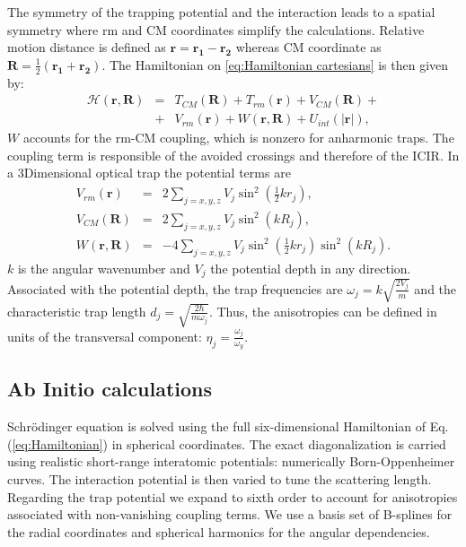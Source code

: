 \documentclass[aps,pre,twocolumn,superscriptaddress,showpacs]{revtex4-1}
\newcommand{\bfeq}[1]{{\boldsymbol{#1}}}
\begin{document}
The symmetry of the trapping potential and the interaction leads to a spatial symmetry where rm and CM coordinates simplify the calculations. Relative motion distance is defined as $\bfeq{r} = \bfeq{r_1} - \bfeq{r_2}$ whereas CM coordinate as $\bfeq{R} = \frac{1}{2}(\bfeq{r_1} + \bfeq{r_2})$. The Hamiltonian on \eqref{eq:Hamiltonian cartesians} is then given by:
\begin{eqnarray}
\mathcal{H}(\bfeq{r}, \bfeq{R}) &=& T_{CM}(\bfeq{R}) + T_{rm}(\bfeq{r}) + V_{CM}(\bfeq{R}) +  \nonumber \\ 
&+& V_{rm}(\bfeq{r}) + W(\bfeq{r}, \bfeq{R}) + U_{int}(|\bfeq{r}|), 
 \label{eq:Hamiltonian}
\end{eqnarray}		
$W$ accounts for the rm-CM coupling, which is nonzero for anharmonic traps. The coupling term is responsible of the avoided crossings and therefore of the ICIR.	In a 3Dimensional optical trap the potential terms are
\begin{eqnarray}
V_{rm}(\bfeq{r}) &=& 2 \sum_{j=x,y,z} V_j \sin^2 \left(\frac{1}{2}k r_j \right), \\
V_{CM}(\bfeq{R}) &=& 2 \sum_{j=x,y,z} V_j \sin^2 \left(k R_j \right), \\
W(\bfeq{r}, \bfeq{R}) &=& -4 \sum_{j=x,y,z} V_j \sin^2 \left(\frac{1}{2}k r_j \right) \sin^2 \left(k R_j \right).
\end{eqnarray}
$k$ is the angular wavenumber and $V_j$ the potential depth in any direction. Associated with the potential depth, the trap frequencies are $\omega_j = k\sqrt{\frac{2V_j}{m}}$ and the characteristic trap length $d_j = \sqrt{\frac{2\hbar}{m\omega_j}}$. Thus, the anisotropies can be defined in units of the transversal component: $\eta_j = \frac{\omega_j}{\omega_y}$.
	
\subsection{Ab Initio calculations} \label{subsec:Ab_initio}
Schrödinger equation is solved using the full six-dimensional Hamiltonian of Eq. (\ref{eq:Hamiltonian}) in spherical coordinates. The exact diagonalization is carried using realistic short-range interatomic potentials: numerically Born-Oppenheimer curves. The interaction potential is then varied to tune the scattering length. Regarding the trap potential we expand to sixth order to account for anisotropies associated with non-vanishing coupling terms.  We use a basis set of B-splines for the radial coordinates and spherical harmonics for the angular dependencies.
\cite{PhysRevA.84.062710}
		
\end{document}
